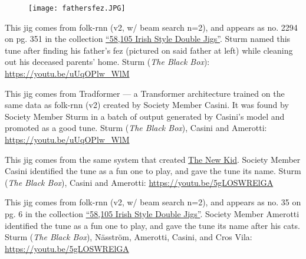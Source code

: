 \documentclass[a4paper,notitlepage,twoside]{book}
\begin{document}
{}
\hypertarget{jig:FathersFez}{}
\begin{figure}
\texttt{[image: fathersfez.JPG]}
\end{figure}
This jig comes from folk-rnn (v2, w/ beam search n=2),
and appears as no. 2294 on pg. 351 in the collection
\href{http://urn.kb.se/resolve?urn=urn:nbn:se:kth:diva-296578}{``58,105 Irish Style Double Jigs''}.
Sturm named this tune after finding his father's fez (pictured on said father at left)
while cleaning out his deceased parents' home.
Sturm ({\em The Black Box}): \url{https://youtu.be/uUqOPlw_WlM}

\clearpage
{}
{}
\hypertarget{jig:NewKid}{}
This jig comes from Tradformer --- a Transformer architecture
trained on the same data as folk-rnn (v2) created by Society Member Casini.
It was found by Society Member Sturm in a batch of output
generated by Casini's model and promoted as a good tune. 
Sturm ({\em The Black Box}), Casini and Amerotti: \url{https://youtu.be/uUqOPlw_WlM}

{}
\hypertarget{jig:TeeteringMagpie}{}
This jig comes from the same system that created \hyperlink{jig:NewKid}{The New Kid}.
Society Member Casini identified the tune as a fun one to play,
and gave the tune its name.
Sturm ({\em The Black Box}), Casini and Amerotti: \url{https://youtu.be/5gLOSWRElGA}

{}
\hypertarget{jig:PlayingKats}{}
This jig comes from folk-rnn (v2, w/ beam search n=2),
and appears as no. 35 on pg. 6 in the collection
\href{http://urn.kb.se/resolve?urn=urn:nbn:se:kth:diva-296578}{``58,105 Irish Style Double Jigs''}.
Society Member Amerotti identified the tune as a fun one to play,
and gave the tune its name after his cats.
Sturm ({\em The Black Box}), Näsström, Amerotti, Casini, and Cros Vila: \url{https://youtu.be/5gLOSWRElGA}
\end{document}
